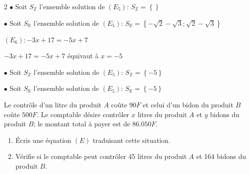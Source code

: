 \begin{multicols*}{2}
  	$\bullet$ Soit $S_{\mathbb{Z}}$ l'ensemble solution de $(E_{5})$: $S_{\mathbb{Z}}=\left\{   \right\}$
  	
  	$\bullet$ Soit $S_{\mathbb{R}}$ l'ensemble solution de $(E_{5})$: $S_{\mathbb{R}}=\left\{-\sqrt{2}-\sqrt{3};\sqrt{2}-\sqrt{3} \right\}$
  	
  	  $(E_{6}): -3x+17= -5x+7 $
  	
  	$-3x+17= -5x+7 $ équivaut à $x=-5$
  	
  	$\bullet$ Soit $S_{\mathbb{Z}}$ l'ensemble solution de $(E_{5})$: $S_{\mathbb{Z}}=\left\{-5 \right\}$
  	
  	$\bullet$ Soit $S_{\mathbb{R}}$ l'ensemble solution de $(E_{5})$: $S_{\mathbb{R}}=\left\{-5 \right\}$
  	
  	
  	Le contrôle d’un litre du produit $A$ coûte $90 F$ et celui d’un bidon du produit $B$ coûte $500 F$. Le comptable désire contrôler $x$ litres du produit $A$ et $y$ bidons du produit $B$; le montant total à payer est de $86.050 F$.
  	
  	\begin{enumerate}
  		\item Écris une équation $(E)$ traduisant cette situation.
  		
  		\item  Vérifie si le comptable peut contrôler 45 litres du produit $A$
  		et 164 bidons du produit $B$.	
  		

\end{enumerate}
\end{multicols*}
